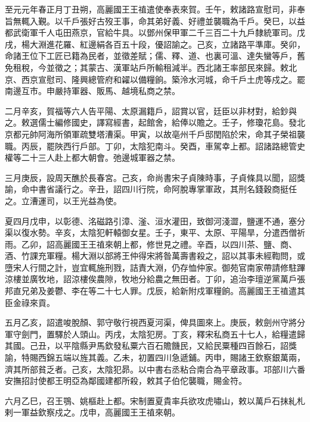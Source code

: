 \begin{pinyinscope}
 至元元年春正月丁丑朔，高麗國王王禃遣使奉表來賀。壬午，敕諸路宣慰司，非奉旨無輒入覲。以千戶張好古歿王事，命其弟好義、好禮並襲職為千戶。癸巳，以益都武衛軍千人屯田燕京，官給牛具。以鄧州保甲軍二千三百二十九戶隸統軍司。戊戌，楊大淵進花羅、紅邊絹各百五十段，優詔諭之。己亥，立諸路平準庫。癸卯，命諸王位下工匠已籍為民者，並徵差賦；儒、釋、道、也裏可溫、達失蠻等戶，舊免租稅，今並徵之；其蒙古、漢軍站戶所輸租減半。西北諸王率部民來歸。敕北京、西京宣慰司、隆興總管府和糴以備糧餉。築泠水河城，命千戶土虎等戍之。罷南邊互市。申嚴持軍器、販馬、越境私商之禁。



 二月辛亥，賀福等六人告平陽、太原漏籍戶，詔賞以官，廷臣以非材對，給鈔與之。敕選儒士編修國史，譯寫經書，起館舍，給俸以贍之。壬子，修瓊花島。發北京都元帥阿海所領軍疏雙塔漕渠。甲寅，以故亳州千戶邸閏陷於宋，命其子榮祖襲職。丙辰，罷陜西行戶部。丁卯，太陰犯南斗。癸酉，車駕幸上都。詔諸路總管史權等二十三人赴上都大朝會。弛邊城軍器之禁。



 三月庚辰，設周天醮於長春宮。己亥，命尚書宋子貞陳時事，子貞條具以聞，詔獎諭，命中書省議行之。辛丑，詔四川行院，命阿脫專掌軍政，其刑名錢穀商挺任之。立漕運司，以王光益為使。



 夏四月戊申，以彰德、洺磁路引漳、滏、洹水灌田，致御河淺澀，鹽運不通，塞分渠以復水勢。辛亥，太陰犯軒轅御女星。壬子，東平、太原、平陽旱，分遣西僧祈雨。乙卯，詔高麗國王王禃來朝上都，修世見之禮。辛酉，以四川茶、鹽、商、酒、竹課充軍糧。楊大淵以部將王仲得宋將昝萬壽書殺之，詔以其事未經鞫問，或墮宋人行間之計，豈宜輒施刑戮，詰責大淵，仍存恤仲家。御苑官南家帶請修駐蹕涼樓並廣牧地，詔涼樓俟農隙，牧地分給農之無田者。丁卯，追治李璮逆黨萬戶張邦直兄弟及姜鬱、李在等二十七人罪。戊辰，給新附戍軍糧餉。高麗國王王禃遣其臣金祿來貢。



 五月乙亥，詔遣唆脫顏、郭守敬行視西夏河渠，俾具圖來上。庚辰，敕劍州守將分軍守劍門，置驛於人頭山。丙戌，太陰犯房。丁亥，釋宋私商五十七人，給糧遣歸其國。己丑，以平陰縣尹馬欽發私粟六百石贍饑民，又給民粟種四百餘石，詔獎諭，特賜西錦五端以旌其義。乙未，初置四川急遞鋪。丙申，賜諸王欽察銀萬兩，濟其所部貧乏者。己亥，太陰犯昴。以中書右丞粘合南合為平章政事。邛部川六番安撫招討使都王明亞為鄰國建都所殺，敕其子伯佗襲職，賜金符。



 六月乙巳，召王鶚、姚樞赴上都。宋制置夏貴率兵欲攻虎嘯山，敕以萬戶石抹糺札剌一軍益欽察戍之。戊申，高麗國王王禃來朝。




\end{pinyinscope}
